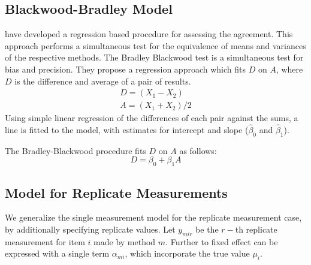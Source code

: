 \documentclass[12pt, a4paper]{report}
\theoremstyle{plain}
\theoremstyle{definition}
\theoremstyle{remark}
\begin{document}






\subsection{Blackwood-Bradley Model} 



\citet{BB89} have developed a regression based procedure for
assessing the agreement. This approach performs a simultaneous test for the equivalence of
means and variances of the respective methods. The Bradley Blackwood test is a simultaneous test for bias and
precision. They propose a regression approach which fits $D$ on $A$, where $D$ is the difference and average of a pair of results. 
\begin{eqnarray}
D = (X_{1}-X_{2}) \\
A = (X_{1} + X_{2}) /2
\end{eqnarray}
Using simple linear regression of the differences of each pair against the sums, a line is fitted to the model, with estimates for intercept and slope ($\hat{\beta}_{0}$ and $\hat{\beta}_{1}$).

The Bradley-Blackwood procedure fits $D$ on $A$ as follows:
\begin{equation}
D = \beta_{0} + \beta_{1}A
\end{equation}




\subsection{Model for Replicate Measurements}



We generalize the single measurement model for the replicate measurement case, by additionally specifying replicate values. Let $y_{mir}$ be the $r-$th replicate measurement for item $i$ made by method $m$. Further to \citet{barnhart} fixed effect can be expressed with a single term $\alpha_{mi}$, which incorporate the true value $\mu_i$.
\end{document}
